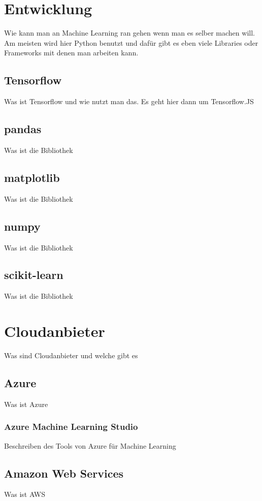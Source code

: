 \section{Entwicklung}
Wie kann man an Machine Learning ran gehen wenn man es selber machen will.
Am meisten wird hier Python benutzt und dafür gibt es eben viele Libraries oder Frameworks mit denen man arbeiten kann.

\subsection{Tensorflow}
Was ist Tensorflow und wie nutzt man das. Es geht hier dann um Tensorflow.JS

\subsection{pandas}
Was ist die Bibliothek

\subsection{matplotlib}
Was ist die Bibliothek

\subsection{numpy}
Was ist die Bibliothek

\subsection{scikit-learn}
Was ist die Bibliothek

\section{Cloudanbieter}
Was sind Cloudanbieter und welche gibt es

\subsection{Azure}
Was ist Azure

\subsubsection{Azure Machine Learning Studio}
Beschreiben des Tools von Azure für Machine Learning

\subsection{Amazon Web Services}
Was ist AWS

